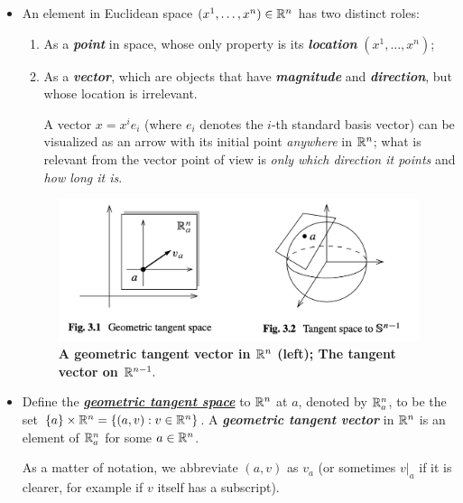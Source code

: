 \documentclass[11pt]{article}
\begin{document}
\begin{itemize}
\item An element in Euclidean space $(x^1, \ldots, x^n) \in {\mathbb R}^{n}$ has two distinct roles: 
\begin{enumerate}
\item As a \emph{\textbf{point}} in space, whose only property is its \emph{\textbf{location}} $(x^1, \ldots, x^n)$;
\item As a \emph{\textbf{vector}}, which are objects that have \emph{\textbf{magnitude}} and \emph{\textbf{direction}}, but whose location is irrelevant.

A vector $x = x^i e_i$ (where $e_i$ denotes the $i$-th standard basis vector) can be visualized as an arrow with its initial point \emph{anywhere} in ${\mathbb R}^n$; what is relevant from the vector point of view is \emph{only which direction it points} and \emph{how long it is}.
\end{enumerate}

\begin{figure}
\begin{minipage}[t]{1\linewidth}
  \centering
  \centerline{\includegraphics[scale = 0.6]{tangent_space_rn.png}}
\end{minipage}
\caption{\footnotesize{\textbf{A geometric tangent vector in ${\mathbb R}^{n}$ (left); The tangent vector on ${\mathbb R}^{n-1}.$ \citep{lee2003introduction}}}}
\label{fig: tangent_space_rn}
\end{figure}

\item \begin{definition}
Define the \underline{\emph{\textbf{geometric tangent space}}} to ${\mathbb R}^n$ at $a$, denoted by ${\mathbb R}_{a}^n$, to be the set $\left\{a\right\} \times {\mathbb R}^n = \left\{(a, v):  v \in {\mathbb R}^n\right\}$. A \emph{\textbf{geometric tangent vector}} in ${\mathbb R}^n$ is an element of ${\mathbb R}_{a}^n$ for some $a \in {\mathbb R}^n$. 
\end{definition}
As a matter of notation, we abbreviate $(a, v)$ as $v_a$ (or sometimes $v|_a$ if it is clearer, for example if $v$ itself has a subscript).


\end{itemize}
\end{document}
